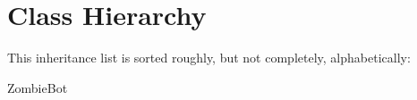 \section{Class Hierarchy}
This inheritance list is sorted roughly, but not completely, alphabetically\+:\begin{DoxyCompactList}
\item {}
\item {}
\item {}
\item {}
\item {}
\item Zombie\+Bot\begin{DoxyCompactList}
\item {}
\end{DoxyCompactList}
\end{DoxyCompactList}
